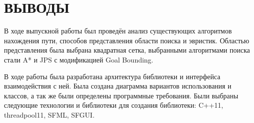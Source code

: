 \section*{ВЫВОДЫ}

\vspace{2\baselineskip} 

В ходе выпускной работы был проведён анализ существующих алгоритмов нахождения пути, способов представления области поиска и эвристик. Областью представления была выбрана квадратная сетка, выбранными алгоритмами поиска стали A* и JPS с модификацией Goal Bounding.

В ходе работы была разработана архитектура библиотеки и интерфейса взаимодействия с ней. Была создана диаграмма вариантов использования и классов, а так же были определены программные требования. Были выбраны следующие технологии и библиотеки для создания библиотеки: C++11, threadpool11, SFML, SFGUI.

